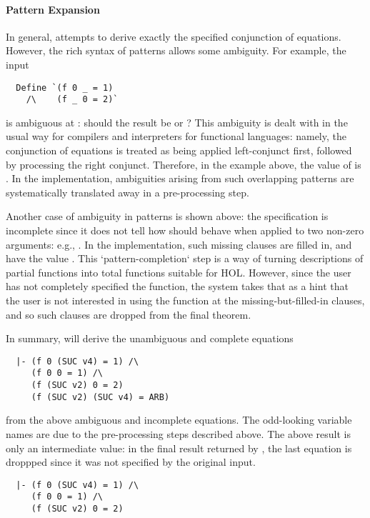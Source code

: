 \paragraph{Pattern Expansion}
In general,  attempts to derive exactly the specified
conjunction of equations. However, the rich syntax of patterns allows
some ambiguity. For example, the input
%
\begin{hol}
\begin{verbatim}
  Define `(f 0 _ = 1)
    /\    (f _ 0 = 2)`
\end{verbatim}
\end{hol}
%
is ambiguous at : should the result be  or
?  This ambiguity is dealt with in the usual way for compilers and
interpreters for functional languages: namely, the conjunction of
equations is treated as being applied left-conjunct first, followed
by processing the right conjunct. Therefore, in the example above, the
value of  is . In the implementation,
ambiguities arising from such overlapping patterns are systematically
translated away in a pre-processing step.

 Another case of ambiguity in patterns is shown above: the specification
is incomplete since it does not tell how  should behave when
applied to two non-zero arguments: e.g., . In the
implementation, such missing clauses are filled in, and have the value
. This `pattern-completion` step is a way of turning descriptions
of partial functions into total functions suitable for HOL. However,
since the user has not completely specified the function, the system
takes that as a hint that the user is not interested in using the
function at the missing-but-filled-in clauses, and so such clauses are
dropped from the final theorem.

In summary,  will derive the unambiguous and complete
equations
%
\begin{hol}
\begin{verbatim}
  |- (f 0 (SUC v4) = 1) /\
     (f 0 0 = 1) /\
     (f (SUC v2) 0 = 2)
     (f (SUC v2) (SUC v4) = ARB)
\end{verbatim}
\end{hol}
%
from the above ambiguous and incomplete equations. The odd-looking
variable names are due to the pre-processing steps described above. The
above result is only an intermediate value: in the final result returned
by \ml{Define}, the last equation is droppped since it was not
specified by the original input.
\begin{hol}
\begin{verbatim}
  |- (f 0 (SUC v4) = 1) /\
     (f 0 0 = 1) /\
     (f (SUC v2) 0 = 2)
\end{verbatim}
\end{hol}

